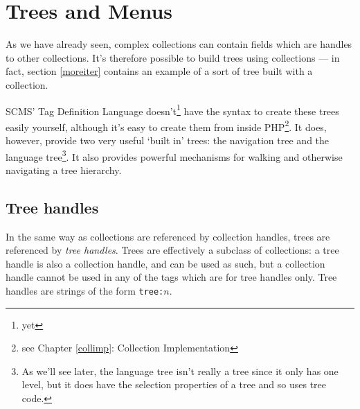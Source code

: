 %
%
%
%
%
%
% 
%
% 
% 
%

\chapter{Trees and Menus}
\label{trees}
As we have already seen, complex collections can contain fields which are
handles to other collections. It's therefore possible to build trees using
collections --- in fact, section \ref{moreiter} contains an example of a sort
of tree built with a collection.

SCMS' Tag Definition Language doesn't\footnote{yet} have the syntax to create
these trees easily yourself, although it's easy to create them from inside
PHP\footnote{see Chapter \ref{collimp}: Collection Implementation}. It does,
however, provide two very useful `built in' trees: the navigation tree and the
language tree\footnote{As we'll see later, the language tree isn't really a
tree since it only has one level, but it does have the selection properties of
a tree and so uses tree code.}. It also provides powerful mechanisms for
walking and otherwise navigating a tree hierarchy.

\section{Tree handles}
In the same way as collections are referenced by collection handles, trees are
referenced by \emph{tree handles}. Trees are effectively a subclass of
collections: a tree handle is also a collection handle, and can be used as
such, but a collection handle cannot be used in any of the tags which are for
tree handles only. Tree handles are strings of the form \texttt{tree:$n$}.

